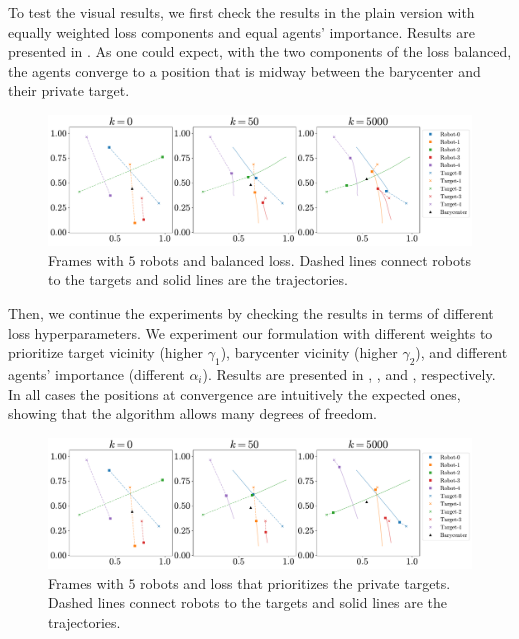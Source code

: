 \documentclass[a4paper,11pt,oneside]{book}
\begin{document}
To test the visual results, we first check the results in the plain version with equally weighted loss components and equal agents' importance. Results are presented in . As one could expect, with the two components of the loss balanced, the agents converge to a position that is midway between the barycenter and their private target.
\begin{figure}[H]
      \centering
      \includegraphics[width=0.9\linewidth]{./figs/aggregative/plain_anim/anim.pdf} 
      \caption{Frames with $5$ robots and balanced loss. Dashed lines connect robots to the targets and solid lines are the trajectories.}
      \label{fig:anim_plain}
\end{figure}

Then, we continue the experiments by checking the results in terms of different loss hyperparameters. We experiment our formulation with different weights to prioritize target vicinity (higher $\gamma_1$), barycenter vicinity (higher $\gamma_2$), and different agents' importance (different $\alpha_i$). Results are presented in , , and , respectively. In all cases the positions at convergence are intuitively the expected ones, showing that the algorithm allows many degrees of freedom.




\begin{figure}[H]
      \centering
      \includegraphics[width=0.9\linewidth]{./figs/aggregative/target_anim/anim.pdf} 
      \caption{Frames with $5$ robots and loss that prioritizes the private targets. Dashed lines connect robots to the targets and solid lines are the trajectories.}
      \label{fig:anim_target}
\end{figure}
\end{document}

